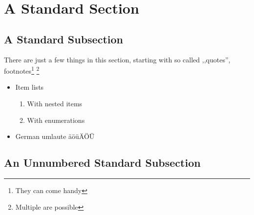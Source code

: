 \pagebreak
\section{A Standard Section}
\subsection[Subsection Alternate Title for TOC]{A Standard Subsection}
There are just a few things in this section, starting with so called ,,quotes'', footnotes\footnote{They can come handy} \footnote{Multiple are possible}
\begin{itemize}
\item{Item lists
  \begin{enumerate}
  \item{With nested items}
  \item{With enumerations}
  \end{enumerate}}
\item{German umlaute \"a\"o\"u\"A\"O\"U}
\end{itemize}
\subsection*{An Unnumbered Standard Subsection}
